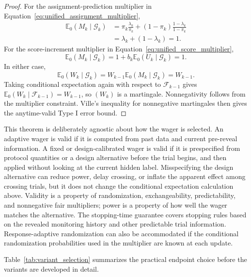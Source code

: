 \documentclass[10pt]{article}
\begin{document}
\begin{proof}
For the assignment-prediction multiplier in Equation~\ref{eq:unified_assignment_multiplier},
\begin{align}
\mathbb{E}_0(M_k \mid \mathcal{G}_k)
&= \pi_k \frac{\lambda_k}{\pi_k}
 + (1-\pi_k)\frac{1-\lambda_k}{1-\pi_k} \\
&= \lambda_k + (1-\lambda_k) = 1.
\end{align}
For the score-increment multiplier in Equation~\ref{eq:unified_score_multiplier},
\begin{equation}
\mathbb{E}_0(M_k \mid \mathcal{G}_k)
= 1 + b_k \mathbb{E}_0(U_k \mid \mathcal{G}_k)
= 1.
\end{equation}
In either case,
\begin{equation}
\mathbb{E}_0(W_k \mid \mathcal{G}_k)
= W_{k-1}\mathbb{E}_0(M_k \mid \mathcal{G}_k)
= W_{k-1}.
\end{equation}
Taking conditional expectation again with respect to $\mathcal{F}_{k-1}$ gives $\mathbb{E}_0(W_k \mid \mathcal{F}_{k-1})=W_{k-1}$, so $(W_k)$ is a martingale. Nonnegativity follows from the multiplier constraint. Ville's inequality for nonnegative martingales \citep{ville1939} then gives the anytime-valid Type I error bound.
\end{proof}

This theorem is deliberately agnostic about how the wager is selected. An adaptive wager is valid if it is computed from past data and current pre-reveal information. A fixed or design-calibrated wager is valid if it is prespecified from protocol quantities or a design alternative before the trial begins, and then applied without looking at the current hidden label. Misspecifying the design alternative can reduce power, delay crossing, or inflate the apparent effect among crossing trials, but it does not change the conditional expectation calculation above. Validity is a property of randomization, exchangeability, predictability, and nonnegative fair multipliers; power is a property of how well the wager matches the alternative. The stopping-time guarantee covers stopping rules based on the revealed monitoring history and other predictable trial information. Response-adaptive randomization can also be accommodated if the conditional randomization probabilities used in the multiplier are known at each update.

Table~\ref{tab:variant_selection} summarizes the practical endpoint choice before the variants are developed in detail.
\end{document}
